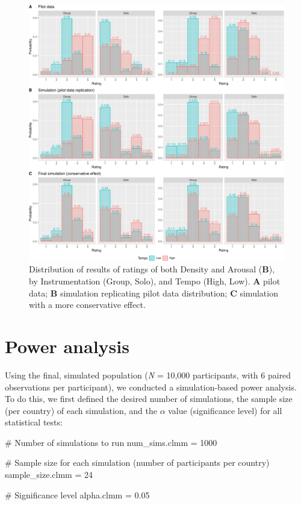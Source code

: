 \documentclass[
  bookmarksnumbered]{article}
\newenvironment{Shaded}{\begin{snugshade}}{\end{snugshade}}
\newcommand{\CommentTok}[1]{\textcolor[rgb]{0.50,0.62,0.50}{#1}}
\newcommand{\DecValTok}[1]{\textcolor[rgb]{0.86,0.86,0.80}{#1}}
\newcommand{\FloatTok}[1]{\textcolor[rgb]{0.75,0.75,0.82}{#1}}
\newcommand{\NormalTok}[1]{\textcolor[rgb]{0.80,0.80,0.80}{#1}}
\newcommand{\OtherTok}[1]{\textcolor[rgb]{0.94,0.94,0.56}{#1}}
\begin{document}
\begin{figure}
\centering
\includegraphics{Power_analysis_files/figure-latex/unnamed-chunk-12-1.pdf}
\caption{\label{fig:unnamed-chunk-12}Distribution of results of ratings of both Density and Arousal (\textbf{B}), by Instrumentation (Group, Solo), and Tempo (High, Low). \textbf{A} pilot data; \textbf{B} simulation replicating pilot data distribution; \textbf{C} simulation with a more conservative effect.}
\end{figure}

\hypertarget{power-section}{%
\section{Power analysis}\label{power-section}}

Using the final, simulated population (\emph{N} = 10,000 participants, with 6 paired observations per participant), we conducted a simulation-based power analysis. To do this, we first defined the desired number of simulations, the sample size (per country) of each simulation, and the \(\alpha\) value (significance level) for all statistical tests:

\begin{Shaded}
\begin{Highlighting}[]
\CommentTok{\# Number of simulations to run}
\NormalTok{num\_sims.clmm }\OtherTok{=} \DecValTok{1000} 

\CommentTok{\# Sample size for each simulation (number of participants per country)}
\NormalTok{sample\_size.clmm }\OtherTok{=} \DecValTok{24} 

\CommentTok{\# Significance level}
\NormalTok{alpha.clmm }\OtherTok{=} \FloatTok{0.05}
\end{Highlighting}
\end{Shaded}
\end{document}
